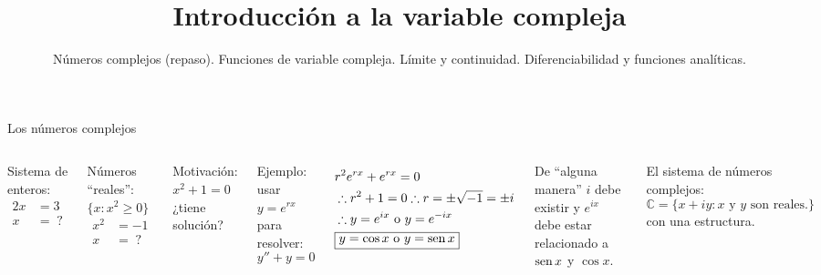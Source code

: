 \documentclass[9pt, aspectratio=169]{beamer}
\title{Introducción a la variable compleja}
\subtitle{Números complejos (repaso). Funciones de variable compleja. Límite y continuidad. Diferenciabilidad y funciones analíticas.}
\begin{document}
\maketitle


\begin{frame}{Los números complejos}
 \begin{columns}[t]
  Sistema de enteros:
  \begin{align*}
  2 x &= 3 \\
  x &= \;?
  \end{align*}
  
  Números ``reales'': $\{ x: x^2 \geq 0\}$
  \begin{align*}
   x^2 &= -1 \\
   x &= \;?
  \end{align*}
  
  Motivación: $ x^2 + 1 = 0 $ ¿tiene solución?
  
  Ejemplo: usar $y = e^{rx}$ para resolver:
  \[  y'' + y = 0 \]
  
  \begin{align*}
   & r^2 e^{rx} + e^{rx} = 0 \\
   & \therefore r^2 + 1 = 0 \therefore r = \pm \sqrt{-1} = \pm i \\
   & \therefore y = e^{ix} \text{ o } y = e^{-ix} \\
   & \boxed{y = \cos x \text{ o } y = \operatorname{sen} x}
  \end{align*}
  
  De ``alguna manera'' $i$ debe existir y $e^{ix}$ debe estar relacionado a $\operatorname{sen} x$ y $\cos x$.
  
  El sistema de \alert{números complejos}:
  \[ \mathbb{C} = \{ x + i y : x \text{ y } y \text{ son reales.} \} \]
  con una estructura.
  

\end{columns}
\end{frame}
\end{document}
